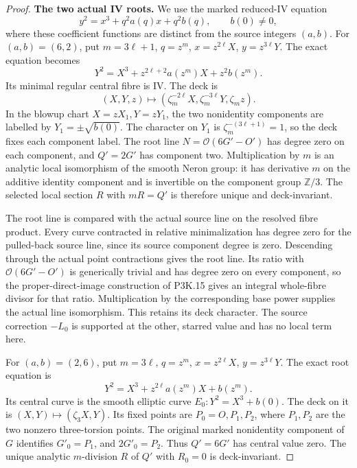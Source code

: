 \begin{proof}
\par\medskip\noindent\textbf{The two actual IV roots.}
We use the marked reduced-IV equation
\[
 y^2=x^3+q^2a(q)x+q^2b(q),\qquad b(0)\ne0,
\]
where these coefficient functions are distinct from the source
integers \((a,b)\). For \((a,b)=(6,2)\), put
\(m=3\ell+1\), \(q=z^m\), \(x=z^{2\ell}X\),
\(y=z^{3\ell}Y\). The exact equation becomes
\[
 Y^2=X^3+z^{2\ell+2}a(z^m)X+z^2b(z^m).
\]
Its minimal regular central fibre is IV. The deck is
\[
 (X,Y,z)\longmapsto
 (\zeta_m^{-2\ell}X,\zeta_m^{-3\ell}Y,\zeta_mz).
\]
In the blowup chart \(X=zX_1,Y=zY_1\), the two nonidentity
components are labelled by \(Y_1=\pm\sqrt{b(0)}\).
The character on \(Y_1\) is \(\zeta_m^{-(3\ell+1)}=1\),
so the deck fixes each component label. The root line
\(N=\mathcal O(6G'-O')\) has degree zero on each component,
and \(Q'=2G'\) has component two. Multiplication by \(m\)
is an analytic local isomorphism of the smooth Neron group:
it has derivative \(m\) on the additive identity component and
is invertible on the component group \(\mathbb Z/3\).
The selected local section \(R\) with \(mR=Q'\) is therefore
unique and deck-invariant.

The root line is compared with the actual source line on the
resolved fibre product. Every curve contracted in relative
minimalization has degree zero for the pulled-back source line,
since its source component degree is zero. Descending through the
actual point contractions gives the root line. Its ratio with
\(\mathcal O(6G'-O')\) is generically trivial and has degree
zero on every component, so the proper-direct-image construction
of P3K.15 gives an integral whole-fibre divisor for that ratio.
Multiplication by the corresponding base power supplies the
actual line isomorphism. This retains its deck character.
The source correction \(-L_0\) is supported at the other,
starred value and has no local term here.

For \((a,b)=(2,6)\), put \(m=3\ell\),
\(q=z^m\), \(x=z^{2\ell}X\), \(y=z^{3\ell}Y\).
The exact root equation is
\[
 Y^2=X^3+z^{2\ell}a(z^m)X+b(z^m).
\]
Its central curve is the smooth elliptic curve
\(E_0:Y^2=X^3+b(0)\). The deck on it is
\((X,Y)\mapsto(\zeta_3X,Y)\). Its fixed points are
\(P_0=O,P_1,P_2\), where \(P_1,P_2\) are the two nonzero
three-torsion points. The original marked nonidentity component
of \(G\) identifies \(G'_0=P_1\), and \(2G'_0=P_2\).
Thus \(Q'=6G'\) has central value zero. The unique analytic
\(m\)-division \(R\) of \(Q'\) with \(R_0=0\) is
deck-invariant.


\end{proof}
